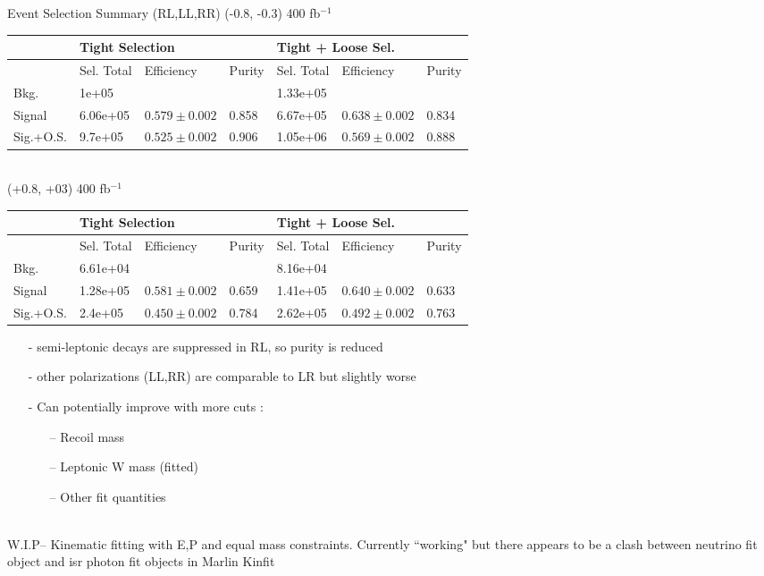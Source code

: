 \documentclass[10pt]{beamer}
\begin{document}
\begin{frame}{Event Selection Summary (RL,LL,RR)}
(-0.8, -0.3) 400 fb$^{-1}$\\
 \begin{tabular}{ |p{}|p{}p{}|p{}|p{}p{}p{}|} 
 \hline 
   &  \multicolumn{3}{|l|}{Tight Selection} &  \multicolumn{3}{|l|}{ Tight + Loose Sel.}  \\  \hline  
 & Sel. Total & Efficiency & Purity & Sel. Total & Efficiency & Purity \\ 
 \hline  
 Bkg. & 1e+05 & & & 1.33e+05 & &  \\ 
 Signal & 6.06e+05 & $0.579 \pm 0.002$ & 0.858 & 6.67e+05 & $0.638 \pm 0.002$ & 0.834 \\ 
 Sig.+O.S. & 9.7e+05  & $0.525 \pm 0.002$ & 0.906 & 1.05e+06 & $0.569 \pm 0.002$ & 0.888 \\ 
\hline 
\end{tabular} \\
(+0.8, +03) 400 fb$^{-1}$\\
 \begin{tabular}{ |p{}|p{}p{}|p{}|p{}p{}p{}|} 
 \hline 
   &  \multicolumn{3}{|l|}{Tight Selection} &  \multicolumn{3}{|l|}{ Tight + Loose Sel.}  \\  \hline  
 & Sel. Total & Efficiency & Purity & Sel. Total & Efficiency & Purity \\ 
 \hline  
 Bkg. & 6.61e+04 & & & 8.16e+04 & &  \\ 
 Signal & 1.28e+05 & $0.581 \pm 0.002$ & 0.659 & 1.41e+05 & $0.640 \pm 0.002$ & 0.633 \\ 
 Sig.+O.S. & 2.4e+05 & $0.450 \pm 0.002$ & 0.784 & 2.62e+05 & $0.492 \pm 0.002$ & 0.763 \\ 
\hline 
\end{tabular}
\scriptsize 
\begin{itemize}
\item[-] semi-leptonic decays are suppressed in RL, so purity is reduced
\item[-] other polarizations (LL,RR) are comparable to LR but slightly worse
\item[-] Can potentially improve with more cuts :
	\begin{itemize}
		\scriptsize
		\item[--] Recoil mass
		\item[--] Leptonic W mass (fitted) 
		\item[--] Other fit quantities
	\end{itemize}	
\end{itemize}
\quad \quad \\
W.I.P-- Kinematic fitting with E,P and equal mass constraints. Currently ``working" but there appears to be a clash between neutrino fit object and isr photon fit objects in Marlin Kinfit




\end{frame}
\end{document}

